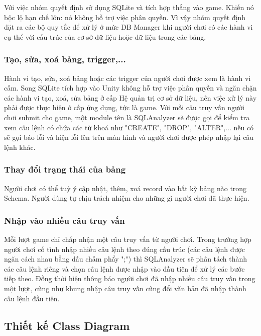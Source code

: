 \hspace*{0.5cm} Với việc nhóm quyết định sử dụng SQLite và tích hợp thẳng vào game. Khiến nó bộc lộ hạn chế lớn: nó không hỗ trợ việc phân quyền. Vì vậy nhóm quyết định đặt ra các bộ quy tắc để xử lý ở mức DB Manager khi người chơi có các hành vi cụ thể với cấu trúc của cơ sở dữ liệu hoặc dữ liệu trong các bảng.
\subsubsection{Tạo, sửa, xoá bảng, trigger,...}
\hspace*{0.5cm} Hành vi tạo, sửa, xoá bảng hoặc các trigger của người chơi được xem là hành vi cấm. Song SQLite tích hợp vào Unity không hỗ trợ việc phân quyền và ngăn chặn các hành vi tạo, xoá, sửa bảng ở cấp Hệ quản trị cơ sở dữ liệu, nên việc xử lý này phải được thực hiện ở cấp ứng dụng, tức là game. Với mỗi câu truy vấn người chơi submit cho game, một module tên là SQLAnalyzer sẽ được gọi để kiểm tra xem câu lệnh có chứa các từ khoá như "CREATE", "DROP", "ALTER",... nếu có sẽ gọi báo lỗi và hiện lỗi lên trên màn hình và người chơi được phép nhập lại câu lệnh khác. 
\subsubsection{Thay đổi trạng thái của bảng}
\hspace*{0.5cm} Người chơi có thể tuỳ ý cập nhật, thêm, xoá record vào bất kỳ bảng nào trong Schema. Người dùng tự chịu trách nhiệm cho những gì người chơi đã thực hiện.

	
\subsubsection{Nhập vào nhiều câu truy vấn}
\hspace*{0.5cm} Mỗi lượt game chỉ chấp nhận một câu truy vấn từ người chơi. Trong trường hợp người chơi cố tình nhập nhiều câu lệnh theo đúng cấu trúc (các câu lệnh được ngăn cách nhau bằng dấu chấm phẩy ";") thì SQLAnalyzer sẽ phân tách thành các câu lệnh riêng và chọn câu lệnh được nhập vào đầu tiên để xử lý các bước tiếp theo. Đồng thời hiện thông báo người chơi đã nhập nhiều câu truy vấn trong một lượt, cũng như khung nhập câu truy vấn cũng đổi văn bản đã nhập thành câu lệnh đầu tiên.
\subsection{Thiết kế Class Diagram}
